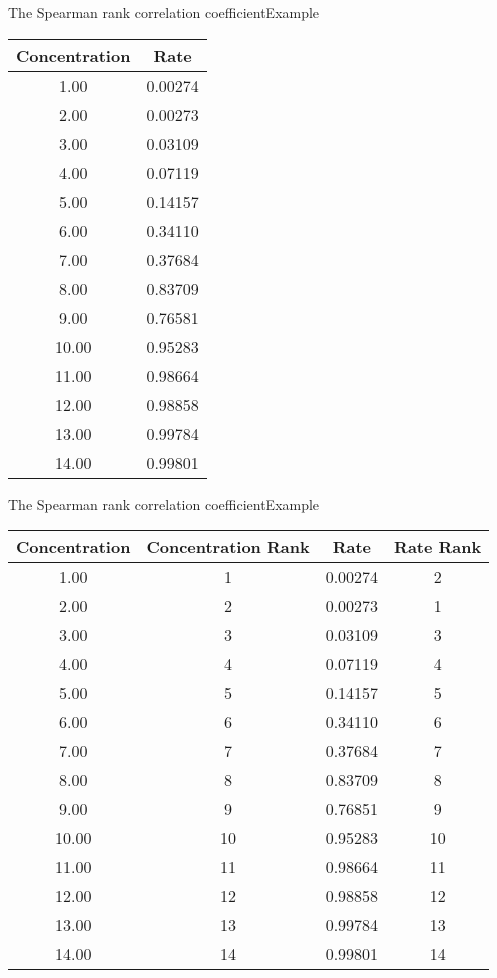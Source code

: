 \documentclass[xcolor=dvipsnames]{beamer}
\begin{document}
\begin{frame}{The Spearman rank correlation coefficient}{Example}
\vspace{-5mm}
	\begin{center}
		\begin{tabular}{cc}
			\hline
			\textbf{Concentration} & \textbf{Rate} \\ 
			\hline \hline
			1.00 & 0.00274 \\ 
			2.00 & 0.00273 \\ 
			3.00 & 0.03109 \\ 
			4.00 & 0.07119 \\ 
			5.00 & 0.14157 \\ 
			6.00 & 0.34110 \\ 
			7.00 & 0.37684 \\ 
			8.00 & 0.83709 \\ 
			9.00 & 0.76581 \\ 
			10.00 & 0.95283 \\ 
			11.00 & 0.98664 \\ 
			12.00 & 0.98858 \\ 
			13.00 & 0.99784 \\ 
			14.00 & 0.99801 \\ \hline
		\end{tabular}
	\end{center}
\end{frame}


\begin{frame}{The Spearman rank correlation coefficient}{Example}
	\vspace{-5mm}
	\begin{center}
		\begin{tabular}{cccc}
			\hline
			\textbf{Concentration} & \textbf{Concentration Rank} & \textbf{Rate}  & \textbf{Rate Rank} \\ 
			\hline \hline
			1.00 & 1 &  0.00274 & 2 \\ 
			2.00 & 2 &0.00273 & 1 \\ 
			3.00 & 3 &0.03109  & 3\\ 
			4.00 & 4 &0.07119  & 4\\ 
			5.00 & 5 &0.14157  & 5\\ 
			6.00 & 6 &0.34110  & 6\\ 
			7.00 & 7 &0.37684  & 7\\ 
			8.00 & 8 &0.83709  & 8\\ 
			9.00 & 9 &0.76851  & 9\\ 
			10.00 & 10 & 0.95283 & 10 \\ 
			11.00 & 11 &0.98664  & 11\\ 
			12.00 & 12 &0.98858  & 12\\ 
			13.00 & 13 &0.99784  & 13\\ 
			14.00 & 14 &0.99801  & 14\\  \hline
		\end{tabular}
	\end{center}
\end{frame}
\end{document}
